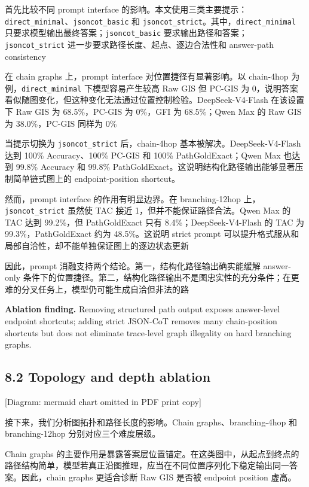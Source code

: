 \documentclass[
  11pt,
]{article}
\begin{document}
首先比较不同 prompt interface
的影响。本文使用三类主要提示：\texttt{direct\_minimal}、\texttt{jsoncot\_basic}
和 \texttt{jsoncot\_strict}。其中，\texttt{direct\_minimal}
只要求模型输出最终答案；\texttt{jsoncot\_basic}
要求输出路径和答案；\texttt{jsoncot\_strict}
进一步要求路径长度、起点、逐边合法性和 answer-path consistency

在 chain graphs 上，prompt interface 对位置捷径有显著影响。以 chain-4hop
为例，\texttt{direct\_minimal} 下模型容易产生较高 Raw GIS 但 PC-GIS 为
0，说明答案看似随图变化，但这种变化无法通过位置控制检验。DeepSeek-V4-Flash
在该设置下 Raw GIS 为 68.5\%，PC-GIS 为 0\%，GFI 为 68.5\%；Qwen Max 的
Raw GIS 为 38.0\%，PC-GIS 同样为 0\%

当提示切换为 \texttt{jsoncot\_strict} 后，chain-4hop
基本被解决。DeepSeek-V4-Flash 达到 100\% Accuracy、100\% PC-GIS 和 100\%
PathGoldExact；Qwen Max 也达到 99.8\% Accuracy 和 99.8\%
PathGoldExact。这说明结构化路径输出能够显著压制简单链式图上的
endpoint-position shortcut。

然而，prompt interface 的作用有明显边界。在 branching-12hop
上，\texttt{jsoncot\_strict} 虽然使 TAC 接近
1，但并不能保证路径合法。Qwen Max 的 TAC 达到 99.2\%，但 PathGoldExact
只有 8.4\%；DeepSeek-V4-Flash 的 TAC 为 99.3\%，PathGoldExact 约为
48.5\%。这说明 strict prompt
可以提升格式服从和局部自洽性，却不能单独保证图上的逐边状态更新

因此，prompt 消融支持两个结论。第一，结构化路径输出确实能缓解
answer-only
条件下的位置捷径。第二，结构化路径输出不是图忠实性的充分条件；在更难的分叉任务上，模型仍可能生成自洽但非法的路

\textbf{Ablation finding.} Removing structured path output exposes
answer-level endpoint shortcuts; adding strict JSON-CoT removes many
chain-position shortcuts but does not eliminate trace-level graph
illegality on hard branching graphs.

\subsection{8.2 Topology and depth
ablation}\label{topology-and-depth-ablation}

{[}Diagram: mermaid chart omitted in PDF print copy{]}

接下来，我们分析图拓扑和路径长度的影响。Chain graphs、branching-4hop 和
branching-12hop 分别对应三个难度层级。

Chain graphs
的主要作用是暴露答案层位置锚定。在这类图中，从起点到终点的路径结构简单，模型若真正沿图推理，应当在不同位置序列化下稳定输出同一答案。因此，chain
graphs 更适合诊断 Raw GIS 是否被 endpoint position 虚高。
\end{document}
